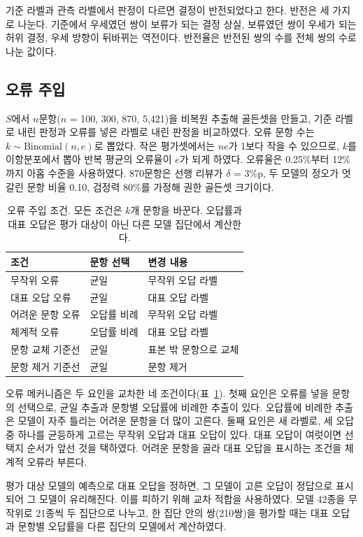 \documentclass[11pt]{article}
\newcommand{\pp}{\%p}
\begin{document}
기준 라벨과 관측 라벨에서 판정이 다르면 결정이 반전되었다고 한다. 반전은 세 가지로 나눈다. 기준에서 우세였던 쌍이 보류가 되는 결정 상실, 보류였던 쌍이 우세가 되는 허위 결정, 우세 방향이 뒤바뀌는 역전이다. 반전율은 반전된 쌍의 수를 전체 쌍의 수로 나눈 값이다.

\subsection{오류 주입}
$S$에서 $n$문항($n$ = 100, 300, 870, 5,421)을 비복원 추출해 골든셋을 만들고, 기준 라벨로 내린 판정과 오류를 넣은 라벨로 내린 판정을 비교하였다. 오류 문항 수는 $k \sim \mathrm{Binomial}(n, e)$로 뽑았다. 작은 평가셋에서는 $ne$가 1보다 작을 수 있으므로, $k$를 이항분포에서 뽑아 반복 평균의 오류율이 $e$가 되게 하였다. 오류율은 0.25\%부터 12\%까지 아홉 수준을 사용하였다. 870문항은 선행 리뷰가 $\delta$ = 3\pp{}, 두 모델의 정오가 엇갈린 문항 비율 0.10, 검정력 80\%를 가정해 권한 골든셋 크기이다.

\begin{table}[t]
\centering\small
\begin{tabular}{@{}lll@{}}
\toprule
조건 & 문항 선택 & 변경 내용 \\
\midrule
무작위 오류 & 균일 & 무작위 오답 라벨 \\
대표 오답 오류 & 균일 & 대표 오답 라벨 \\
어려운 문항 오류 & 오답률 비례 & 무작위 오답 라벨 \\
체계적 오류 & 오답률 비례 & 대표 오답 라벨 \\
\midrule
문항 교체 기준선 & 균일 & 표본 밖 문항으로 교체 \\
문항 제거 기준선 & 균일 & 문항 제거 \\
\bottomrule
\end{tabular}
\caption{오류 주입 조건. 모든 조건은 $k$개 문항을 바꾼다. 오답률과 대표 오답은 평가 대상이 아닌 다른 모델 집단에서 계산한다.}
\label{tab:conditions}
\end{table}

오류 메커니즘은 두 요인을 교차한 네 조건이다(표~\ref{tab:conditions}). 첫째 요인은 오류를 넣을 문항의 선택으로, 균일 추출과 문항별 오답률에 비례한 추출이 있다. 오답률에 비례한 추출은 모델이 자주 틀리는 어려운 문항을 더 많이 고른다. 둘째 요인은 새 라벨로, 세 오답 중 하나를 균등하게 고르는 무작위 오답과 대표 오답이 있다. 대표 오답이 여럿이면 선택지 순서가 앞선 것을 택하였다. 어려운 문항을 골라 대표 오답을 표시하는 조건을 체계적 오류라 부른다.

평가 대상 모델의 예측으로 대표 오답을 정하면, 그 모델이 고른 오답이 정답으로 표시되어 그 모델이 유리해진다. 이를 피하기 위해 교차 적합을 사용하였다. 모델 42종을 무작위로 21종씩 두 집단으로 나누고, 한 집단 안의 쌍(210쌍)을 평가할 때는 대표 오답과 문항별 오답률을 다른 집단의 모델에서 계산하였다.
\end{document}

